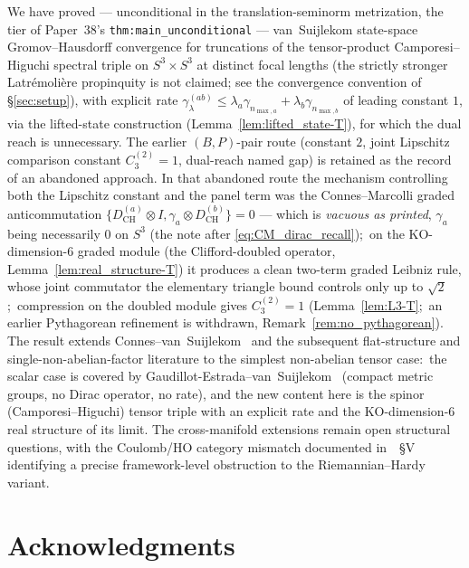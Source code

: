\documentclass[11pt,a4paper]{article}
\theoremstyle{plain}
\theoremstyle{definition}
\newcommand{\nmaxa}{n_{\max,a}}
\newcommand{\nmaxb}{n_{\max,b}}
\newcommand{\sthree}{S^{3}}
\newcommand{\DCH}{D_{\mathrm{CH}}}
\begin{document}
We have proved --- unconditional in the translation-seminorm metrization,
the tier of Paper~38's \texttt{thm:main\_unconditional} --- van~Suijlekom
state-space Gromov--Hausdorff convergence for truncations of the
tensor-product Camporesi--Higuchi spectral triple on
$\sthree \times \sthree$ at distinct focal lengths
(the strictly stronger Latr\'emoli\`ere propinquity is not claimed; see
the convergence convention of \S\ref{sec:setup}), with explicit rate
$\gamma^{(ab)}_\lambda \le \lambda_a\gamma_{\nmaxa} + \lambda_b\gamma_{\nmaxb}$
of leading constant $1$, via the lifted-state construction
(Lemma~\ref{lem:lifted_state-T}), for which the dual reach is unnecessary.
The earlier $(B,P)$-pair route (constant $2$, joint Lipschitz comparison
constant $C_3^{(2)} = 1$, dual-reach named gap) is retained as the
record of an abandoned approach. In that abandoned route the mechanism
controlling both the Lipschitz constant and the panel term was the
Connes--Marcolli graded anticommutation
$\{\DCH^{(a)} \otimes I, \gamma_a \otimes \DCH^{(b)}\} = 0$ --- which is
\emph{vacuous as printed}, $\gamma_a$ being necessarily $0$ on $\sthree$
(the note after \eqref{eq:CM_dirac_recall});\ on the KO-dimension-6 graded
module (the Clifford-doubled operator, Lemma~\ref{lem:real_structure-T})
it produces a clean two-term graded Leibniz rule, whose joint commutator
the elementary triangle bound controls only up to $\sqrt 2$;\ compression on
the doubled module gives $C_3^{(2)} = 1$ (Lemma~\ref{lem:L3-T};\ an earlier
Pythagorean refinement is withdrawn, Remark~\ref{rem:no_pythagorean}). The result
extends Connes--van~Suijlekom~\cite{connes_vs2021} and the subsequent
flat-structure and single-non-abelian-factor literature
\cite{hekkelman2022, leimbach_vs2024,
loutey_paper38} to the simplest non-abelian tensor case:\ the scalar
case is covered by Gaudillot-Estrada--van~Suijlekom~\cite{gaudillot_vs2025}
(compact metric groups, no Dirac operator, no rate), and the new content
here is the spinor (Camporesi--Higuchi) tensor triple with an explicit
rate and the KO-dimension-6 real structure of its limit. The cross-manifold extensions
remain open structural questions, with the Coulomb/HO category
mismatch documented in~\cite{paper24}~\S V identifying a precise
framework-level obstruction to the Riemannian--Hardy variant.

\section*{Acknowledgments}
\end{document}
